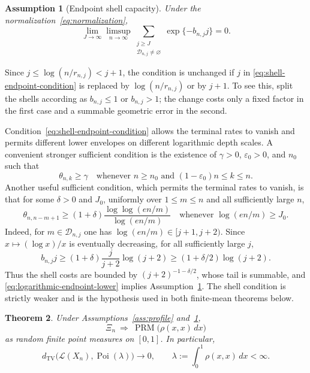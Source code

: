 \documentclass[11pt]{article}
\newtheorem{theorem}{Theorem}[section]
\theoremstyle{remark}
\theoremstyle{plain}
\newtheorem{assumption}[theorem]{Assumption}
\newcommand{\cL}{\mathcal L}
\newcommand{\eps}{\varepsilon}
\newcommand{\Poi}{\operatorname{Poi}}
\newcommand{\TV}{\operatorname{TV}}
\begin{document}
\begin{assumption}[Endpoint shell capacity]
\label{ass:fixed-endpoint}
Under the normalization~\eqref{eq:normalization},
\begin{equation}\label{eq:shell-endpoint-condition}
 \lim_{J\to\infty}\limsup_{n\to\infty}
 \sum_{\substack{j\ge J\\\mathcal D_{n,j}\ne\varnothing}}
 \exp\{-b_{n,j}j\}=0.
\end{equation}
\end{assumption}

Since $j\le\log(n/r_{n,j})<j+1$, the condition is unchanged if $j$ in
\eqref{eq:shell-endpoint-condition} is replaced by $\log(n/r_{n,j})$ or by
$j+1$.  To see this, split the shells according as $b_{n,j}\le1$ or
$b_{n,j}>1$; the change costs only a fixed factor in the first case and a
summable geometric error in the second.

Condition~\eqref{eq:shell-endpoint-condition} allows the terminal rates to
vanish and permits different lower envelopes on different logarithmic depth
scales.  A convenient stronger sufficient condition is the existence of
$\gamma>0$, $\eps_0>0$, and $n_0$ such that
\begin{equation}\label{eq:endpoint-lower}
 \theta_{n,k}\ge\gamma
 \quad\text{whenever }n\ge n_0\text{ and }(1-\eps_0)n\le k\le n.
\end{equation}
Another useful sufficient condition, which permits the terminal rates to
vanish, is that for some $\delta>0$ and $J_0$, uniformly over $1\le m\le n$
and all sufficiently large $n$,
\begin{equation}\label{eq:logarithmic-endpoint-lower}
 \theta_{n,n-m+1}\ge(1+\delta)
 \frac{\log\log(en/m)}{\log(en/m)}
 \quad\text{whenever }\log(en/m)\ge J_0.
\end{equation}
Indeed, for $m\in\mathcal D_{n,j}$ one has
$\log(en/m)\in[j+1,j+2)$.  Since $x\mapsto(\log x)/x$ is eventually
decreasing, for all sufficiently large $j$,
\[
 b_{n,j}j
 \ge(1+\delta)\frac{j}{j+2}\log(j+2)
 \ge(1+\delta/2)\log(j+2).
\]
Thus the shell costs are bounded by $(j+2)^{-1-\delta/2}$, whose tail is
summable, and \eqref{eq:logarithmic-endpoint-lower} implies
Assumption~\ref{ass:fixed-endpoint}.
The shell condition is strictly weaker and is the hypothesis used in both
finite-mean theorems below.

\begin{theorem}\label{thm:main-poisson}
Under Assumptions~\ref{ass:profile} and~\ref{ass:fixed-endpoint},
\begin{equation}\label{eq:point-process-limit}
 \Xi_n\ \Longrightarrow\ \operatorname{PRM}
 \bigl(\rho(x,x)\,dx\bigr)
\end{equation}
as random finite point measures on $[0,1]$.  In particular,
\begin{equation}\label{eq:count-poisson}
 d_{\TV}\bigl(\cL(X_n),\Poi(\lambda)\bigr)\longrightarrow0,
 \qquad
 \lambda:=\int_0^1\rho(x,x)\,dx<\infty.
\end{equation}
\end{theorem}
\end{document}
